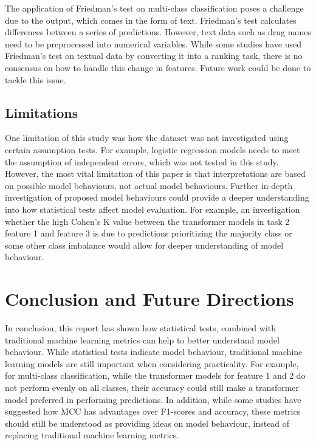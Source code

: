 \documentclass[10.7pt, onecolumn]{article}
\begin{document}
The application of Friedman's test on multi-class classification poses a challenge due to the output, which comes in the form of text. Friedman's test calculates differences between a series of predictions. However, text data such as drug names need to be preprocessed into numerical variables. While some studies have used Friedman's test on textual data by converting it into a ranking task\cite{article1}, there is no consensus on how to handle this change in features. Future work could be done to tackle this issue.

\subsection{Limitations}

One limitation of this study was how the dataset was not investigated using certain assumption tests. For example, logistic regression models needs to meet the assumption of independent errors, which was not tested in this study. However, the most vital limitation of this paper is that interpretations are based on possible model behaviours, not actual model behaviours. Further in-depth investigation of proposed model behaviours could provide a deeper understanding into how statistical tests affect model evaluation. For example, an investigation whether the high Cohen's K value between the transformer models in task 2 feature 1 and feature 3 is due to predictions prioritizing the majority class or some other class imbalance would allow for deeper understanding of model behaviour.

\section{Conclusion and Future Directions}

In conclusion, this report has shown how statistical tests, combined with traditional machine learning metrics can help to better understand model behaviour. While statistical tests indicate model behaviour, traditional machine learning models are still important when considering practicality. For example, for multi-class classification, while the transformer models for feature 1 and 2 do not perform evenly on all classes, their accuracy could still make a transformer model preferred in performing predictions. In addition, while some studies have suggested how MCC has advantages over F1-scores and accuracy\cite{articlesss}, these metrics should still be understood as providing ideas on model behaviour, instead of replacing traditional machine learning metrics.
\end{document}
